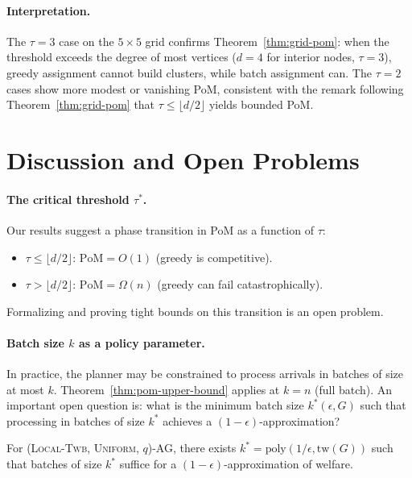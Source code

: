 \documentclass[11pt]{article}
\newcommand{\PoM}{\mathrm{PoM}}
\begin{document}
\paragraph{Interpretation.}
The $\tau = 3$ case on the $5\times5$ grid confirms Theorem~\ref{thm:grid-pom}:
when the threshold exceeds the degree of most vertices ($d = 4$ for interior nodes,
$\tau = 3$), greedy assignment cannot build clusters, while batch assignment can.
The $\tau = 2$ cases show more modest or vanishing PoM, consistent with the remark
following Theorem~\ref{thm:grid-pom} that $\tau \leq \lfloor d/2 \rfloor$ yields
bounded PoM.

\section{Discussion and Open Problems}
\label{sec:discussion}

\paragraph{The critical threshold $\tau^*$.}
Our results suggest a phase transition in PoM as a function of $\tau$:
\begin{itemize}
  \item $\tau \leq \lfloor d/2 \rfloor$: $\PoM = O(1)$ (greedy is competitive).
  \item $\tau > \lfloor d/2 \rfloor$: $\PoM = \Omega(n)$ (greedy can fail
    catastrophically).
\end{itemize}
Formalizing and proving tight bounds on this transition is an open problem.

\paragraph{Batch size $k$ as a policy parameter.}
In practice, the planner may be constrained to process arrivals in batches of size
at most $k$.
Theorem~\ref{thm:pom-upper-bound} applies at $k = n$ (full batch).
An important open question is: what is the minimum batch size $k^*(\epsilon, G)$
such that processing in batches of size $k^*$ achieves a $(1-\epsilon)$-approximation?

\begin{conjecture}
  For (\textsc{Local-Twb}, \textsc{Uniform}, $q$)-AG, there exists
  $k^* = \text{poly}(1/\epsilon, \mathrm{tw}(G))$ such that batches of size $k^*$
  suffice for a $(1-\epsilon)$-approximation of welfare.
\end{conjecture}
\end{document}
